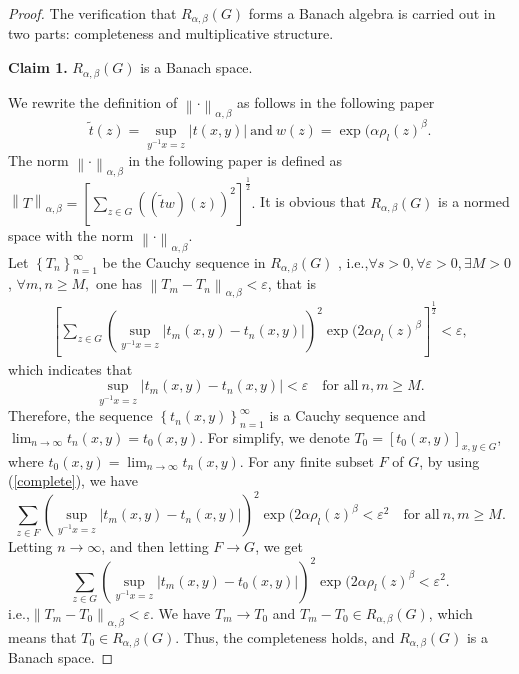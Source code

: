 \documentclass[preprint,11pt]{elsarticle}
\numberwithin{equation}{section}
\begin{document}
	\begin{proof}
		
		The verification that $R_{\alpha,\beta }(G)$ forms a Banach algebra is carried out in two parts: completeness and multiplicative structure.
		
		\textbf{Claim 1.} $R_{\alpha,\beta }(G)$ is a Banach space. 
		
		We rewrite the definition of $\left \| \cdot  \right \| _{\alpha,\beta }$ as follows in the following paper  $$ \tilde{t}(z)=\sup_{ y^{-1}x=z } 
		\left | t(x,y) \right |~\text{and}~ w(z)=\exp(\alpha \rho_{l }(z)^{\beta}.$$
		The norm $\left \| \cdot  \right \|_{\alpha,\beta }$ in the following paper is defined as $\left \| T \right \|_{\alpha,\beta} 
		= [\sum _{z\in G} ((\tilde{t}  w)(z))^{2} ] ^\frac{1}{2}.$
		It is obvious that  $R_{\alpha,\beta }(G)$ 
		is a normed space with the norm $\left \| \cdot \right \|_{\alpha,\beta }$.\\
		Let $\left \{ T_{n} \right \}_{n=1}^{\infty} $ be the Cauchy sequence in $R_{\alpha,\beta }(G)$ , i.e.,$\forall s>0,\forall \varepsilon >0,\exists M>0$,  $\forall m,n\ge M,$ one has $\left \| T_{m}-T_{n} \right \| _{\alpha,\beta}<\varepsilon $, that is
		\begin{align}\label{complete}
			[ \sum_{z\in G} (\sup_{y^{-1}x=z}\left | t_{m}(x,y)-t_{n}(x,y) \right | )^{2}\exp(2\alpha \rho_{l }(z)^{\beta} ]^{\frac{1}{2} }<\varepsilon,
		\end{align}
		which indicates that
		\[\sup_{y^{-1}x=z}\left | t_{m}(x,y)-t_{n}(x,y) \right | <\varepsilon\quad \text{for~all}~n,m\ge M.\]
		Therefore, the sequence $\left \{ t_n(x,y) \right \}_{n=1}^{\infty} $ is a Cauchy sequence and $\lim_{n \to \infty} t_{n}(x,y)=t_{0}(x,y)$. 
		For simplify, we denote $T_{0} = [t_{0}(x, y)]_{x,y\in G}$, where $t_{0}(x,y)=\lim_{n \to \infty} t_{n}(x,y)$.
		For any finite subset $F$ of $G$, by using (\ref{complete}), we have
		\[ \sum_{z\in F} (\sup_{y^{-1}x=z}\left | t_{m}(x,y)-t_{n}(x,y) \right | )^{2}\exp(2\alpha \rho_{l }(z)^{\beta}<\varepsilon^2\quad \text{for~all} ~n,m\ge M.\]
		Letting $n\to \infty $, and then letting $F\to G$, we get 
		\[ \sum_{z\in G} (\sup_{y^{-1}x=z}\left | t_{m}(x,y)-t_{0}(x,y) \right | )^{2}\exp(2\alpha \rho_{l }(z)^{\beta}<\varepsilon^2.\]
		i.e.,$\left \| T_{m}-T_{0} \right \| _{\alpha,\beta }<\varepsilon$.
		We have $T_{m}\to T_{0}$ and $T_m-T_0\in R_{\alpha,\beta }(G)$, which means that $T_0\in R_{\alpha,\beta }(G)$.
		Thus, the completeness holds, and $R_{\alpha,\beta }(G)$ is a Banach space.
		

\end{proof}
\end{document}
